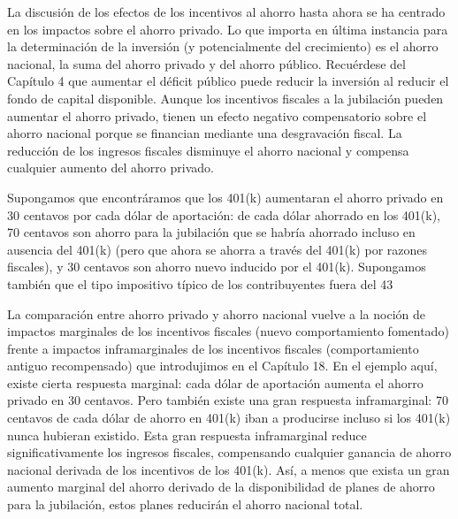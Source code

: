 \documentclass[10pt,a4paper]{article}
\begin{document}
La discusión de los efectos de los incentivos al ahorro hasta ahora se ha centrado en los impactos sobre el ahorro privado. Lo que importa en última instancia para la determinación de la inversión (y potencialmente del crecimiento) es el ahorro nacional, la suma del ahorro privado y del ahorro público. Recuérdese del Capítulo 4 que aumentar el déficit público puede reducir la inversión al reducir el fondo de capital disponible. Aunque los incentivos fiscales a la jubilación pueden aumentar el ahorro privado, tienen un efecto negativo compensatorio sobre el ahorro nacional porque se financian mediante una desgravación fiscal. La reducción de los ingresos fiscales disminuye el ahorro nacional y compensa cualquier aumento del ahorro privado.

Supongamos que encontráramos que los 401(k) aumentaran el ahorro privado en 30 centavos por cada dólar de aportación: de cada dólar ahorrado en los 401(k), 70 centavos son ahorro para la jubilación que se habría ahorrado incluso en ausencia del 401(k) (pero que ahora se ahorra a través del 401(k) por razones fiscales), y 30 centavos son ahorro nuevo inducido por el 401(k). Supongamos también que el tipo impositivo típico de los contribuyentes fuera del 43 %

La comparación entre ahorro privado y ahorro nacional vuelve a la noción de impactos marginales de los incentivos fiscales (nuevo comportamiento fomentado) frente a impactos inframarginales de los incentivos fiscales (comportamiento antiguo recompensado) que introdujimos en el Capítulo 18. En el ejemplo aquí, existe cierta respuesta marginal: cada dólar de aportación aumenta el ahorro privado en 30 centavos. Pero también existe una gran respuesta inframarginal: 70 centavos de cada dólar de ahorro en 401(k) iban a producirse incluso si los 401(k) nunca hubieran existido. Esta gran respuesta inframarginal reduce significativamente los ingresos fiscales, compensando cualquier ganancia de ahorro nacional derivada de los incentivos de los 401(k). Así, a menos que exista un gran aumento marginal del ahorro derivado de la disponibilidad de planes de ahorro para la jubilación, estos planes reducirán el ahorro nacional total.
\end{document}
